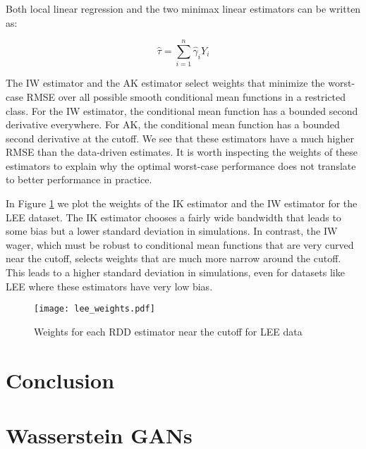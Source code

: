 \documentclass[12pt]{article}
\theoremstyle{definition}
\begin{document}
Both local linear regression and the two minimax linear estimators can be written as: 

\[ \hat \tau = \sum \limits_{i=1}^n \hat \gamma_i Y_i \] 

The IW estimator and the AK estimator select weights that minimize the worst-case RMSE over all possible smooth conditional mean functions in a restricted class. For the IW estimator, the conditional mean function has a bounded second derivative everywhere. For AK, the conditional mean function has a bounded second derivative at the cutoff. We see that these estimators have a much higher RMSE than the data-driven estimates. It is worth inspecting the weights of these estimators to explain why the optimal worst-case performance does not translate to better performance in practice. 

In Figure \ref{fig:weights} we plot the weights of the IK estimator and the IW estimator for the LEE dataset. The IK estimator chooses a fairly wide bandwidth that leads to some bias but a lower standard deviation in simulations. In contrast, the IW wager, which must be robust to conditional mean functions that are very curved near the cutoff, selects weights that are much more narrow around the cutoff. This leads to a higher standard deviation in simulations, even for datasets like LEE where these estimators have very low bias. 

\begin{figure}[ht] 
\centering
\texttt{[image: lee\_weights.pdf]} 
\caption{Weights for each RDD estimator near the cutoff for LEE data} 
\label{fig:weights} 
\end{figure} 


\section{Conclusion} 

\newpage



\appendix

\section{Wasserstein GANs} 


\label{sec:wgan} 
\end{document}
